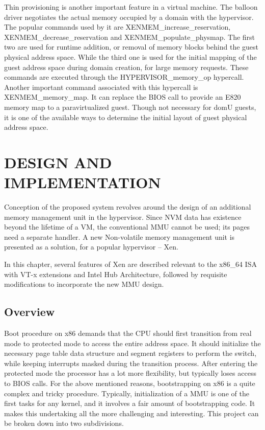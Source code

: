  

Thin provisioning is another important feature in a virtual machine. The balloon driver negotiates the actual memory occupied by a domain with the hypervisor. The popular commands used by it are XENMEM\_increase\_reservation, XENMEM\_decrease\_reservation and XENMEM\_populate\_physmap. The first two are used for runtime addition, or removal of memory blocks behind the guest physical address space. While the third one is used for the initial mapping of the guest address space during domain creation, for large memory requests. These commands are executed through the HYPERVISOR\_memory\_op hypercall. Another important command associated with this hypercall is XENMEM\_memory\_map. It can replace the BIOS call to provide an E820 memory map to a paravirtualized guest. Though not necessary for domU guests, it is one of the available ways to determine the initial layout of guest physical address space. 




\chapter{\uppercase{Design and Implementation}}

Conception of the proposed system revolves around the design of an additional memory management unit in the hypervisor. Since NVM data has existence beyond the lifetime of a VM, the conventional MMU cannot be used; its pages need a separate handler. A new Non-volatile memory management unit is presented as a solution, for a popular hypervisor -- Xen.  

In this chapter, several features of Xen are described relevant to the x86\_64 ISA with VT-x extensions and Intel Hub Architecture, followed by requisite modifications to incorporate the new MMU design. 

\section{Overview}

Boot procedure on x86 demands that the CPU should first transition from real mode to protected mode to access the entire address space. It should initialize the necessary page table data structure and segment registers to perform the switch, while keeping interrupts masked during the transition process. After entering the protected mode the processor has a lot more flexibility, but typically loses access to BIOS calls. For the above mentioned reasons, bootstrapping on x86 is a quite complex and tricky procedure. Typically, initialization of a MMU is one of the first tasks for any kernel, and it involves a fair amount of bootstrapping code. It makes this undertaking all the more challenging and interesting. This project can be broken down into two subdivisions. 

